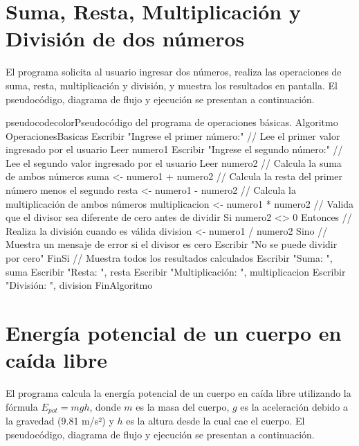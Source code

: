 \section{Suma, Resta, Multiplicación y División de dos números}

El programa solicita al usuario ingresar dos números, realiza las operaciones de suma, resta, multiplicación y división, y muestra los resultados en pantalla. El pseudocódigo, diagrama de flujo y ejecución se presentan a continuación.

\begin{sourcecode}{pseudocodecolor}{Pseudocódigo del programa de operaciones básicas.}
Algoritmo OperacionesBasicas
    Escribir "Ingrese el primer número:"
    // Lee el primer valor ingresado por el usuario
    Leer numero1
    Escribir "Ingrese el segundo número:"
    // Lee el segundo valor ingresado por el usuario
    Leer numero2
    // Calcula la suma de ambos números
    suma <- numero1 + numero2
    // Calcula la resta del primer número menos el segundo
    resta <- numero1 - numero2
    // Calcula la multiplicación de ambos números
    multiplicacion <- numero1 * numero2
    // Valida que el divisor sea diferente de cero antes de dividir
    Si numero2 <> 0 Entonces
        // Realiza la división cuando es válida
        division <- numero1 / numero2
    Sino
        // Muestra un mensaje de error si el divisor es cero
        Escribir "No se puede dividir por cero"
    FinSi
    // Muestra todos los resultados calculados
    Escribir "Suma: ", suma
    Escribir "Resta: ", resta
    Escribir "Multiplicación: ", multiplicacion
    Escribir "División: ", division
FinAlgoritmo
\end{sourcecode}



\section{Energía potencial de un cuerpo en caída libre}

El programa calcula la energía potencial de un cuerpo en caída libre utilizando la fórmula $E_{pot} = mgh$, donde $m$ es la masa del cuerpo, $g$ es la aceleración debido a la gravedad (9.81 m/s²) y $h$ es la altura desde la cual cae el cuerpo. El pseudocódigo, diagrama de flujo y ejecución se presentan a continuación.

